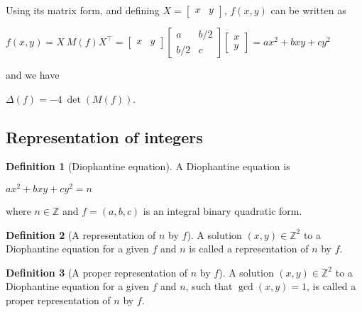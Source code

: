 \documentclass{article}
\theoremstyle{definition}
\newtheorem{definition}{Definition}[section]
\theoremstyle{theorem}
\theoremstyle{example}
\theoremstyle{corollary}
\begin{document}
\bigskip

Using its matrix form, and defining \(X = \begin{bmatrix} x & y \end{bmatrix}\), \(f(x, y)\) can be written as

\begin{center}
\(f(x, y) = X \ M(f) X^{\top} = \begin{bmatrix} x & y \end{bmatrix} \begin{bmatrix} a & b/2 \\ b/2 & c \end{bmatrix} \begin{bmatrix} x \\ y \end{bmatrix} = a x^{2} + b xy + c y^{2}\)
\end{center}

and we have

\begin{center}
\(\Delta(f) = -4 \ \det(M(f))\).
\end{center}

\bigskip




\subsection{Representation of integers}

\bigskip

\theoremstyle{definition}
\begin{definition}[Diophantine equation]
A Diophantine equation is
\begin{center}
\(a x^{2} + b x y + c y^{2} = n\)
\end{center}
where \(n \in \mathbb{Z}\) and \(f = (a, b, c)\) is an integral binary quadratic form.
\end{definition}

\bigskip

\theoremstyle{definition}
\begin{definition}[A representation of \(n\) by \(f\)]
A solution \((x, y) \in \mathbb{Z}^{2}\) to a Diophantine equation for a given \(f\) and \(n\) is called a representation of \(n\) by \(f\).
\end{definition}

\bigskip

\theoremstyle{definition}
\begin{definition}[A proper representation of \(n\) by \(f\)]
A solution \((x, y) \in \mathbb{Z}^{2}\) to a Diophantine equation for a given \(f\) and \(n\), such that \(\gcd(x, y) = 1\), is called a proper representation of \(n\) by \(f\).
\end{definition}
\end{document}
